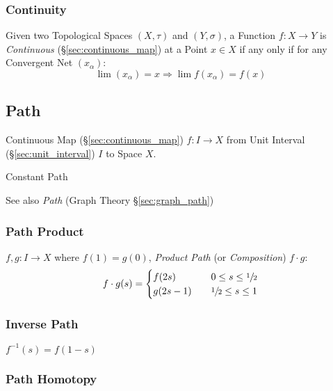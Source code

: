\subsubsection{Continuity}\label{sec:net_continuity}

Given two Topological Spaces $(X,\tau)$ and $(Y,\sigma)$, a Function
$f : X \rightarrow Y$ is \emph{Continuous}
(\S\ref{sec:continuous_map}) at a Point $x \in X$ if any only if for
any Convergent Net $(x_\alpha)$:
\[
  \lim (x_\alpha) = x \Rightarrow \lim f(x_\alpha) = f(x)
\]



\subsection{Path}\label{sec:path} \cite{hatcher02}

Continuous Map (\S\ref{sec:continuous_map}) $f : I \rightarrow X$ from
Unit Interval (\S\ref{sec:unit_interval}) $I$ to Space $X$.

Constant Path %

\fist See also \emph{Path} (Graph Theory \S\ref{sec:graph_path})



\subsubsection{Path Product}\label{sec:path_product}

$f,g : I \rightarrow X$ where $f(1) = g(0)$, \emph{Product Path} (or
\emph{Composition}) $f \cdot g$:
\[
  f \cdot g (s) =
  \begin{cases}
    f(2s)   & \quad 0 \leq s \leq \sfrac{1}{2} \\
    g(2s-1) & \quad \sfrac{1}{2} \leq s \leq 1 \\
  \end{cases}
\]



\subsubsection{Inverse Path}\label{sec:inverse_path}

$f^{-1}(s) = f(1-s)$



\subsubsection{Path Homotopy}\label{sec:path_homotopy}

